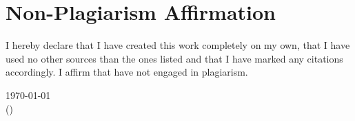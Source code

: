 
\newpage

{}

\section*{Non-Plagiarism Affirmation}

I hereby declare that I have created this work completely on my own, that I have used no other sources than the ones listed and that I have marked any citations accordingly. I affirm that have not engaged in plagiarism.

\vspace{2cm}

\begin{flushright}
	\today{} \dotfill\\
	\hfill {\footnotesize (\docauthor)}
\end{flushright}


